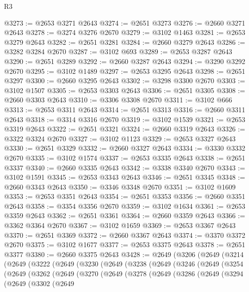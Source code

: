 \begin{lexlean}{R3}
\begin{coremodule}
@3273 := @2653 @3271 @2643
@3274 := @2651 @3273
@3276 := @2660 @3271 @2643
@3278 := @3274 @3276 @2670
@3279 := @3102 @1463
@3281 := @2653 @3279 @2643
@3282 := @2651 @3281
@3284 := @2660 @3279 @2643
@3286 := @3282 @3284 @2670
@3287 := @3102 @693
@3289 := @2653 @3287 @2643
@3290 := @2651 @3289
@3292 := @2660 @3287 @2643
@3294 := @3290 @3292 @2670
@3295 := @3102 @1489
@3297 := @2653 @3295 @2643
@3298 := @2651 @3297
@3300 := @2660 @3295 @2643
@3302 := @3298 @3300 @2670
@3303 := @3102 @1507
@3305 := @2653 @3303 @2643
@3306 := @2651 @3305
@3308 := @2660 @3303 @2643
@3310 := @3306 @3308 @2670
@3311 := @3102 @666
@3313 := @2653 @3311 @2643
@3314 := @2651 @3313
@3316 := @2660 @3311 @2643
@3318 := @3314 @3316 @2670
@3319 := @3102 @1539
@3321 := @2653 @3319 @2643
@3322 := @2651 @3321
@3324 := @2660 @3319 @2643
@3326 := @3322 @3324 @2670
@3327 := @3102 @1123
@3329 := @2653 @3327 @2643
@3330 := @2651 @3329
@3332 := @2660 @3327 @2643
@3334 := @3330 @3332 @2670
@3335 := @3102 @1574
@3337 := @2653 @3335 @2643
@3338 := @2651 @3337
@3340 := @2660 @3335 @2643
@3342 := @3338 @3340 @2670
@3343 := @3102 @1591
@3345 := @2653 @3343 @2643
@3346 := @2651 @3345
@3348 := @2660 @3343 @2643
@3350 := @3346 @3348 @2670
@3351 := @3102 @1609
@3353 := @2653 @3351 @2643
@3354 := @2651 @3353
@3356 := @2660 @3351 @2643
@3358 := @3354 @3356 @2670
@3359 := @3102 @1634
@3361 := @2653 @3359 @2643
@3362 := @2651 @3361
@3364 := @2660 @3359 @2643
@3366 := @3362 @3364 @2670
@3367 := @3102 @1659
@3369 := @2653 @3367 @2643
@3370 := @2651 @3369
@3372 := @2660 @3367 @2643
@3374 := @3370 @3372 @2670
@3375 := @3102 @1677
@3377 := @2653 @3375 @2643
@3378 := @2651 @3377
@3380 := @2660 @3375 @2643
@3428 := @2649
    (@3206
      (@2649
        (@3214
          (@2649
            (@3222
              (@2649
                (@3230
                  (@2649
                    (@3238
                      (@2649
                        (@3246
                          (@2649
                            (@3254
                              (@2649
                                (@3262
                                  (@2649
                                    (@3270
                                      (@2649
                                        (@3278
                                          (@2649
                                            (@3286
                                              (@2649
                                                (@3294
                                                  (@2649
                                                    (@3302
                                                      (@2649

\end{coremodule}
\end{lexlean}
